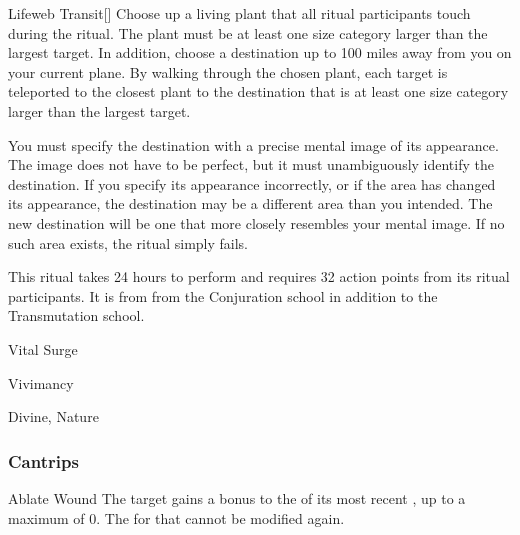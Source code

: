 \lowercase{\hypertarget{spell:Lifeweb Transit}{}}\label{spell:Lifeweb Transit}
\begin{apability}[Rank 5]{\hypertarget{spell:Lifeweb Transit}{Lifeweb Transit}}[]
Choose up a living plant that all ritual participants touch during the ritual.
The plant must be at least one size category larger than the largest target.
In addition, choose a destination up to 100 miles away from you on your current plane.
By walking through the chosen plant, each target is teleported to the closest plant to the destination that is at least one size category larger than the largest target.

You must specify the destination with a precise mental image of its appearance.
The image does not have to be perfect, but it must unambiguously identify the destination.
If you specify its appearance incorrectly, or if the area has changed its appearance, the destination may be a different area than you intended.
The new destination will be one that more closely resembles your mental image.
If no such area exists, the ritual simply fails.

This ritual takes 24 hours to perform and requires 32 action points from its ritual participants.
It is from from the Conjuration school in addition to the Transmutation school.
\end{apability}
\vspace{0.25em}


\newpage
\begin{spellsection}{Vital Surge}

\begin{spellheader}
\end{spellheader}


 Vivimancy

 Divine, Nature

\subsubsection{Cantrips}


\begin{freeability}{Ablate Wound}
The target gains a  bonus to the  of its most recent , up to a maximum of 0.
The  for that  cannot be modified again.
\end{freeability}

\end{spellsection}


